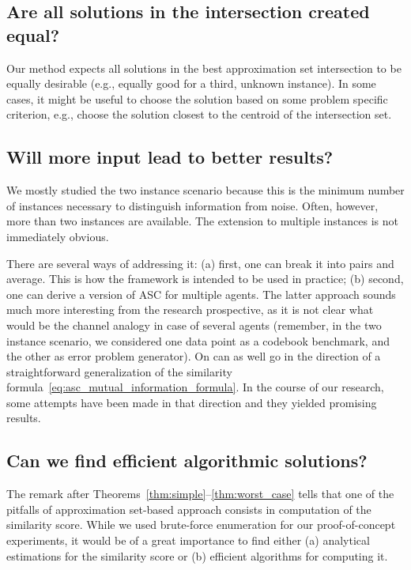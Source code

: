 \subsection*{Are all solutions in the intersection created equal?}
Our method expects all solutions in the best approximation set intersection to
be equally desirable (e.g., equally good for a third, unknown instance). In some
cases, it might be useful to choose the solution based on some problem specific
criterion, e.g., choose the solution closest to the centroid of the intersection
set.

\subsection*{Will more input lead to better results?}
We mostly studied the two instance scenario because this is the minimum number
of instances necessary  to distinguish information from noise. Often, however,
more than two instances are available. The extension to multiple instances is
not immediately obvious.

There are several ways of addressing it: (a) first, one can break it into pairs
and average. This is how the framework is intended to be used in practice; (b)
second, one can derive a version of ASC for multiple agents. The latter approach
sounds much more interesting from the research prospective, as it is not clear
what would be the channel analogy in case of several agents (remember, in the
two instance scenario, we considered one data point as a codebook benchmark, and
the other as error problem generator). On can as well go in the direction of a
straightforward generalization of the similarity
formula~\eqref{eq:asc_mutual_information_formula}. In the course of our
research, some attempts have been made in that direction and they yielded
promising results.


\subsection*{Can we find efficient algorithmic solutions?}

The remark after Theorems~\ref{thm:simple}--\ref{thm:worst_case} tells that one
of the pitfalls of approximation set-based approach consists in computation of
the similarity score. While we used brute-force enumeration for our
proof-of-concept experiments, it would be of a great importance to find either
(a) analytical estimations for the similarity score or (b) efficient algorithms
for computing it.

